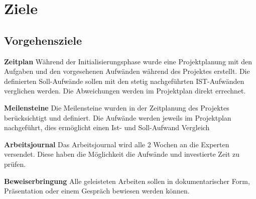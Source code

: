 \section{Ziele}
\subsection{Vorgehensziele}

\textbf{Zeitplan}
\newline
Während der Initialisierungsphase wurde eine Projektplanung mit den Aufgaben und den vorgesehenen Aufwänden während des Projektes erstellt. Die definierten Soll-Aufwände sollen mit den stetig nachgeführten IST-Aufwänden verglichen werden. Die Abweichungen werden im Projektplan direkt errechnet.

\textbf{Meilensteine}
\newline
Die Meilensteine wurden in der Zeitplanung des Projektes berücksichtigt und definiert. Die Aufwände werden jeweils im Projektplan nachgeführt, dies ermöglicht einen Ist- und Soll-Aufwand Vergleich

\textbf{Arbeitsjournal}
\newline
Das Arbeitsjournal wird alle 2 Wochen an die Experten versendet. Diese haben die Möglichkeit die Aufwände und investierte Zeit zu prüfen.

\textbf{Beweiserbringung}
\newline
Alle geleisteten Arbeiten sollen in dokumentarischer Form, Präsentation oder einem Gespräch bewiesen werden können.